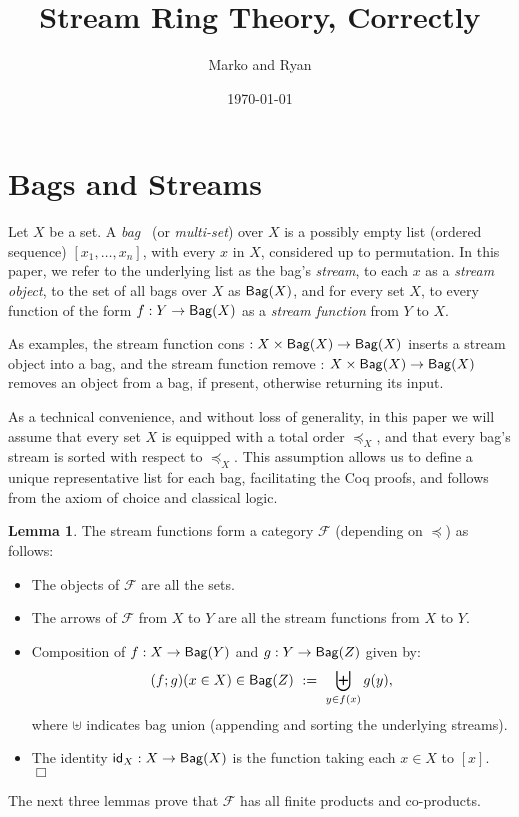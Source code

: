 \documentclass{article}
\title{Stream Ring Theory, Correctly}
\author{Marko and Ryan}
\date{\today}
\begin{document}
\maketitle
{}

\section{Bags and Streams}
\indent 
Let $X$ be a set.  A {\it bag}~\cite{bags} (or {\it multi-set}) over $X$ is a possibly empty list (ordered sequence) $[x_1,\ldots,x_n]$, with every $x$ in $X$, considered up to permutation.  In this paper, we refer to the underlying list as the bag's {\it stream}, to each $x$ as a {\it stream object}, to the set of all bags over $X$ as ${\sf Bag}(X)$, and for every set $X$, to every function of the form $f : Y \to {\sf Bag}(X)$ as a {\it stream function} from $Y$ to $X$.  

As examples, the stream function {\sf cons} $: X \times {\sf Bag}(X) \to {\sf Bag}(X)$ inserts a stream object into a bag, and the stream function {\sf remove} : $X \times {\sf Bag}(X) \to {\sf Bag}(X)$ removes an object from a bag, if present, otherwise returning its input. 


As a technical convenience, and without loss of generality, in this paper we will assume that every set $X$ is equipped with a total order $\preceq_X$, and that every bag's stream is sorted with respect to $\preceq_X$.  This assumption allows us to define a unique representative list for each bag, facilitating the Coq proofs, and follows from the axiom of choice and classical logic. 


{\bf Lemma 1}. The stream functions form a category $\mathcal{F}$ (depending on $\preceq$) as follows: 

\begin{itemize}
    \item The objects of $\mathcal{F}$ are all the sets. 
    \item The arrows of $\mathcal{F}$ from $X$ to $Y$ are all the stream functions from $X$ to $Y$.
    \item Composition of $f : X \to {\sf Bag}(Y)$ and $g : Y \to {\sf Bag}(Z)$ given by: 
$$(f;g)(x \in X) \in {\sf Bag}(Z) \ := \  \biguplus_{y \in f(x)} g(y),$$ where $\uplus$ indicates bag union (appending and sorting the underlying streams). 
\item The identity ${\sf id}_X : X \to {\sf Bag}(X)$ is the function taking each $x \in X$ to $[x]$.  \hfill $\Box$ 
\end{itemize}  
The next three lemmas prove that $\mathcal{F}$ has all finite products and co-products. 
\end{document}
